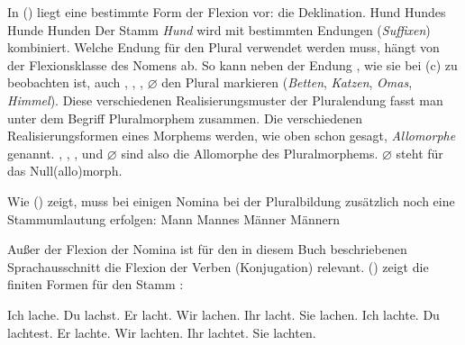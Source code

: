 In () liegt eine bestimmte Form der Flexion vor: die Deklination.
\eal
\ex Hund\label{bsp-hund-nom}
\ex Hundes\label{bsp-hund-gen}
\ex Hunde
\ex Hunden
\zl
Der Stamm \emph{Hund} wird mit bestimmten Endungen (\emph{Suffixen})
kombiniert. Welche Endung für den Plural verwendet werden muss, hängt von der Flexionsklasse
des Nomens ab. So kann neben der Endung , wie sie bei (c) zu beobachten ist, auch
, , , $\varnothing$ den Plural markieren (\emph{Betten},
\emph{Katzen}, \emph{Omas}, \emph{Himmel}). Diese verschiedenen Realisierungsmuster der Pluralendung
fasst man unter dem Begriff Pluralmorphem zusammen. Die verschiedenen Realisierungsformen eines
Morphems werden, wie oben schon gesagt, \emph{Allomorphe} genannt. , , ,  und
$\varnothing$ sind also die Allomorphe des Pluralmorphems. $\varnothing$ steht für das Null(allo)morph.

Wie () zeigt, muss bei einigen Nomina bei der Pluralbildung zusätzlich noch eine Stammumlautung erfolgen:
\eal
\ex Mann\label{bsp-mann-nom}
\ex Mannes\label{bsp-mann-gen}
\ex Männer
\ex Männern
\zl


\noindent
Außer der Flexion der Nomina ist für den in diesem Buch beschriebenen Sprachausschnitt die 
Flexion der Verben (Konjugation) relevant. () zeigt die finiten Formen für
den Stamm :
\begin{multicols}{2}
\eal
\label{verb-konjugation-praesens}
\ex Ich lache.
\ex Du  lachst.
\ex Er  lacht.
\ex Wir lachen.
\ex Ihr lacht.
\ex Sie lachen.
\zl
\eal
\label{verb-konjugation-praeteritum}
\ex Ich lachte.
\ex Du  lachtest.
\ex Er  lachte.
\ex Wir lachten.
\ex Ihr lachtet.
\ex Sie lachten.
\zl
\end{multicols}

